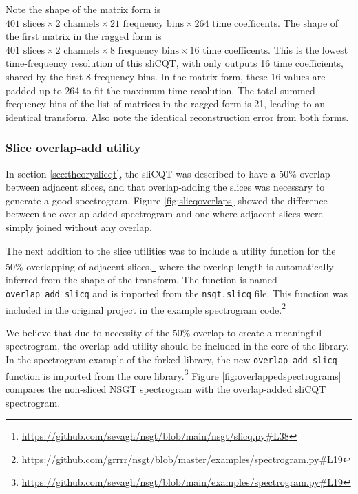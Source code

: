 \documentclass[report.tex]{subfiles}
\begin{document}
Note the shape of the matrix form is $401 \text{ slices} \times 2 \text{ channels} \times 21 \text{ frequency bins} \times 264 \text{ time coefficents}$. The shape of the first matrix in the ragged form is $401 \text{ slices} \times 2 \text{ channels} \times 8 \text{ frequency bins} \times 16 \text{ time coefficents}$. This is the lowest time-frequency resolution of this sliCQT, with only outputs 16 time coefficients, shared by the first 8 frequency bins. In the matrix form, these 16 values are padded up to 264 to fit the maximum time resolution. The total summed frequency bins of the list of matrices in the ragged form is 21, leading to an identical transform. Also note the identical reconstruction error from both forms.

\subsubsection{Slice overlap-add utility}
\label{sec:slicqola}

In section \ref{sec:theoryslicqt}, the sliCQT was described to have a 50\% overlap between adjacent slices, and that overlap-adding the slices was necessary to generate a good spectrogram. Figure \ref{fig:slicqoverlaps} showed the difference between the overlap-added spectrogram and one where adjacent slices were simply joined without any overlap.

The next addition to the slice utilities was to include a utility function for the 50\% overlapping of adjacent slices,\footnote{\url{https://github.com/sevagh/nsgt/blob/main/nsgt/slicq.py\#L38}} where the overlap length is automatically inferred from the shape of the transform. The function is named \Verb#overlap_add_slicq# and is imported from the \Verb#nsgt.slicq# file. This function was included in the original project in the example spectrogram code.\footnote{\url{https://github.com/grrrr/nsgt/blob/master/examples/spectrogram.py\#L19}}

We believe that due to necessity of the 50\% overlap to create a meaningful spectrogram, the overlap-add utility should be included in the core of the library. In the spectrogram example of the forked library, the new \Verb#overlap_add_slicq# function is imported from the core library.\footnote{\url{https://github.com/sevagh/nsgt/blob/main/examples/spectrogram.py\#L19}} Figure \ref{fig:overlappedspectrograms} compares the non-sliced NSGT spectrogram with the overlap-added sliCQT spectrogram.
\end{document}
